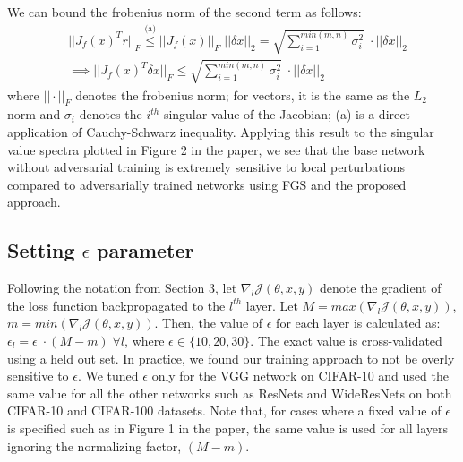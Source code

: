 We can bound the frobenius norm of the second term as follows:
\begin{align*}
& ||J_f(x)^{T}r||_F \stackrel{\text{(a)}}{\leq} ||J_f(x)||_F\;||\delta x||_2=\sqrt{\sum_{i=1}^{min(m,n)}\sigma_i^2}\;\cdot||\delta x||_2 \\
& \implies||J_f(x)^{T}\delta x||_F\leq\sqrt{\sum_{i=1}^{min(m,n)}\sigma_i^2}\;\cdot||\delta x||_2
\end{align*}
where $||\cdot||_F$ denotes the frobenius norm; for vectors, it is the same as the $L_2$ norm and $\sigma_i$ denotes the $i^{th}$ singular value of the Jacobian; (a) is a direct application of Cauchy-Schwarz inequality. Applying this result to the singular value spectra plotted in Figure 2 in the paper, we see that the base network without adversarial training is extremely sensitive to local perturbations compared to adversarially trained networks using FGS and the proposed approach. 

\subsection*{Setting $\epsilon$ parameter}
Following the notation from Section 3, let $\nabla_{l}\mathcal{J}(\theta,x,y)$ denote the gradient of the loss function backpropagated to the $l^{th}$ layer. Let $M = max(\nabla_{l}\mathcal{J}(\theta,x,y))$, $m = min(\nabla_{l}\mathcal{J}(\theta,x,y))$. Then, the value of $\epsilon$ for each layer is calculated as: ${\epsilon}_{l}=\epsilon\;\cdot(M-m)\; \forall l$, where $\epsilon\in\{10,20,30\}$. The exact value is cross-validated using a held out set. In practice, we found our training approach to not be overly sensitive to $\epsilon$. We tuned $\epsilon$ only for the VGG network on CIFAR-10 and used the same value for all the other networks such as ResNets and WideResNets on both CIFAR-10 and CIFAR-100 datasets. Note that, for cases where a fixed value of $\epsilon$ is specified such as in Figure 1 in the paper, the same value is used for all layers ignoring the normalizing factor, $(M-m)$.
